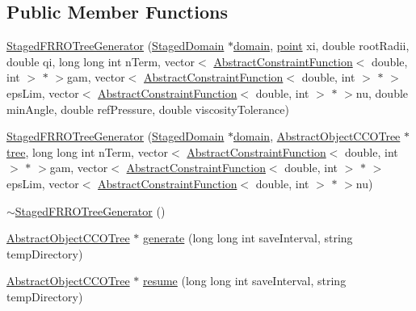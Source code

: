 \subsection*{Public Member Functions}
\begin{DoxyCompactItemize}
\item 
\hyperlink{class_staged_f_r_r_o_tree_generator_a00f41805e256a579e91c4519fab7b016}{Staged\+F\+R\+R\+O\+Tree\+Generator} (\hyperlink{class_staged_domain}{Staged\+Domain} $\ast$\hyperlink{class_staged_f_r_r_o_tree_generator_a2f8616a24551a7a414b51b805309894a}{domain}, \hyperlink{structpoint}{point} xi, double root\+Radii, double qi, long long int n\+Term, vector$<$ \hyperlink{class_abstract_constraint_function}{Abstract\+Constraint\+Function}$<$ double, int $>$ $\ast$ $>$gam, vector$<$ \hyperlink{class_abstract_constraint_function}{Abstract\+Constraint\+Function}$<$ double, int $>$ $\ast$ $>$eps\+Lim, vector$<$ \hyperlink{class_abstract_constraint_function}{Abstract\+Constraint\+Function}$<$ double, int $>$ $\ast$ $>$nu, double min\+Angle, double ref\+Pressure, double viscosity\+Tolerance)
\item 
\hyperlink{class_staged_f_r_r_o_tree_generator_a3dc2c3e1959e0df5d1a46c696acdcf0a}{Staged\+F\+R\+R\+O\+Tree\+Generator} (\hyperlink{class_staged_domain}{Staged\+Domain} $\ast$\hyperlink{class_staged_f_r_r_o_tree_generator_a2f8616a24551a7a414b51b805309894a}{domain}, \hyperlink{class_abstract_object_c_c_o_tree}{Abstract\+Object\+C\+C\+O\+Tree} $\ast$\hyperlink{class_staged_f_r_r_o_tree_generator_a3d7a0b0194b93d4c2706a21908ad9f09}{tree}, long long int n\+Term, vector$<$ \hyperlink{class_abstract_constraint_function}{Abstract\+Constraint\+Function}$<$ double, int $>$ $\ast$ $>$gam, vector$<$ \hyperlink{class_abstract_constraint_function}{Abstract\+Constraint\+Function}$<$ double, int $>$ $\ast$ $>$eps\+Lim, vector$<$ \hyperlink{class_abstract_constraint_function}{Abstract\+Constraint\+Function}$<$ double, int $>$ $\ast$ $>$nu)
\item 
\hyperlink{class_staged_f_r_r_o_tree_generator_ace0cc12588d7ca428520e5e08dfd5e83}{$\sim$\+Staged\+F\+R\+R\+O\+Tree\+Generator} ()
\item 
\hyperlink{class_abstract_object_c_c_o_tree}{Abstract\+Object\+C\+C\+O\+Tree} $\ast$ \hyperlink{class_staged_f_r_r_o_tree_generator_ad119cb329ca876b0bcd87ac5c7393d6a}{generate} (long long int save\+Interval, string temp\+Directory)
\item 
\hyperlink{class_abstract_object_c_c_o_tree}{Abstract\+Object\+C\+C\+O\+Tree} $\ast$ \hyperlink{class_staged_f_r_r_o_tree_generator_ac7e665c88ecc8fbae365bc9f74cfdb45}{resume} (long long int save\+Interval, string temp\+Directory)

\end{DoxyCompactItemize}
